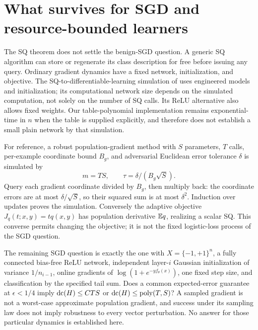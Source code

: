 \section{What survives for SGD and resource-bounded learners}\label{sec:resources}
The SQ theorem does not settle the benign-SGD question. A generic SQ algorithm can store or regenerate its class description for free before issuing any query. Ordinary gradient dynamics have a fixed network, initialization, and objective. The SQ-to-differentiable-learning simulation of \citet{AKMSS21} uses engineered models and initialization; its computational network size depends on the simulated computation, not solely on the number of SQ calls. Its ReLU alternative also allows fixed weights. Our table-polynomial implementation remains exponential-time in $n$ when the table is supplied explicitly, and therefore does not establish a small plain network by that simulation.

For reference, a robust population-gradient method with $S$ parameters, $T$ calls, per-example coordinate bound $B_g$, and adversarial Euclidean error tolerance $\delta$ is simulated by
\[
 m=TS,\qquad\tau=\delta/(B_g\sqrt S).
\]
Query each gradient coordinate divided by $B_g$, then multiply back: the coordinate errors are at most $\delta/\sqrt S$, so their squared sum is at most $\delta^2$. Induction over updates proves the simulation. Conversely the adaptive objective $J_q(t;x,y)=tq(x,y)$ has population derivative $\mathbb E q$, realizing a scalar SQ. This converse permits changing the objective; it is not the fixed logistic-loss process of the SGD question.

The remaining SGD question is exactly the one with $X=\{-1,+1\}^n$, a fully connected bias-free ReLU network, independent layer-$i$ Gaussian initialization of variance $1/n_{i-1}$, online gradients of $\log(1+e^{-yf_\theta(x)})$, one fixed step size, and classification by the specified tail sum. Does a common expected-error guarantee at $\epsilon<1/4$ imply $\operatorname{dc}(H)\le CTS$ or $\operatorname{dc}(H)\le\operatorname{poly}(T,S)$? A sampled gradient is not a worst-case approximate population gradient, and success under its sampling law does not imply robustness to every vector perturbation. No answer for those particular dynamics is established here.


